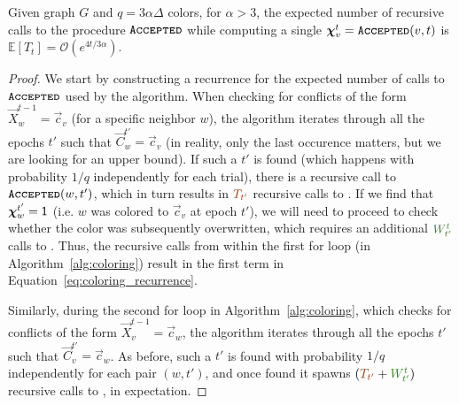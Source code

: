 \begin{lemma}
\label{lem:coloring_recurrence}
Given graph $G$ and $q=3\alpha\Delta$ colors, for $\alpha > 3$, the expected number of recursive calls to the procedure $\texttt{\textsc{Accepted}}$
while computing a single $\bm\chi^t_v = \texttt{\textsc{Accepted}}(v,t)$ is $\mathbb E[T_t] = \mathcal{O}\left(e^{4t/3\alpha}\right)$.
\end{lemma}
\begin{proof}
We start by constructing a recurrence for the expected number of calls to $\texttt{\textsc{Accepted}}$ used by the algorithm.
When checking for conflicts of the form $\vec X^{t-1}_w = \vec c_v$ (for a specific neighbor $w$),
the algorithm iterates through all the epochs $t'$ such that $\vec C^{t'}_w = \vec c_v$
(in reality, only the last occurence matters, but we are looking for an upper bound).
If such a $t'$ is found (which happens with probability $1/q$ independently for each trial), there is a recursive call to $\texttt{\textsc{Accepted}}(w,t')$,
which in turn results in $\textcolor{RawSienna}{T_{t'}}$ recursive calls to .
If we find that $\bm\chi^{t'}_w = \mathsf{1}$ (i.e. $w$ was colored to $\vec c_v$ at epoch $t'$),
we will need to proceed to check whether the color was subsequently overwritten,
which requires an additional $\textcolor{OliveGreen}{W^t_{t'}}$ calls to .
Thus, the recursive calls from within the first for loop (in Algorithm~\ref{alg:coloring})
result in the first term in Equation~\ref{eq:coloring_recurrence}.

Similarly, during the second for loop in Algorithm~\ref{alg:coloring}, which checks for conflicts of the form $\vec X^{t-1}_v = \vec c_w$,
the algorithm iterates through all the epochs $t'$ such that $\vec C^{t'}_v = \vec c_w$.
As before, such a $t'$ is found with probability $1/q$ independently for each pair $(w, t')$,
and once found it spawns $(\textcolor{RawSienna}{T_{t'}}+\textcolor{OliveGreen}{W^t_{t'}})$ recursive calls to , in expectation.


\end{proof}
